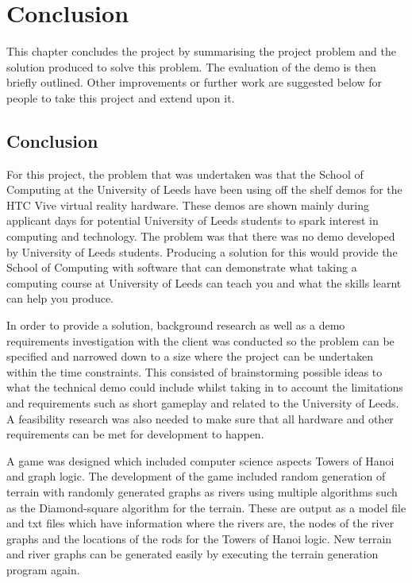 \chapter{Conclusion}
\label{chapter8}

This chapter concludes the project by summarising the project problem and the solution produced to solve this problem. The evaluation of the demo is then briefly outlined. Other improvements or further work are suggested below for people to take this project and extend upon it.

\section{Conclusion}
For this project, the problem that was undertaken was that the School of Computing at the University of Leeds have been using off the shelf demos for the HTC Vive virtual reality hardware. These demos are shown mainly during applicant days for potential University of Leeds students to spark interest in computing and technology. The problem was that there was no demo developed by University of Leeds students. Producing a solution for this would provide the School of Computing with software that can demonstrate what taking a computing course at University of Leeds can teach you and what the skills learnt can help you produce.
\newline
\par
In order to provide a solution, background research as well as a demo requirements investigation with the client was conducted so the problem can be specified and narrowed down to a size where the project can be undertaken within the time constraints. This consisted of brainstorming possible ideas to what the technical demo could include whilst taking in to account the limitations and requirements such as short gameplay and related to the University of Leeds. A feasibility research was also needed to make sure that all hardware and other requirements can be met for development to happen.
\newline
\par
A game was designed which included computer science aspects Towers of Hanoi and graph logic. The development of the game included random generation of terrain with randomly generated graphs as rivers using multiple algorithms such as the Diamond-square algorithm for the terrain. These are output as a model file and txt files which have information where the rivers are, the nodes of the river graphs and the locations of the rods for the Towers of Hanoi logic. New terrain and river graphs can be generated easily by executing the terrain generation program again.
